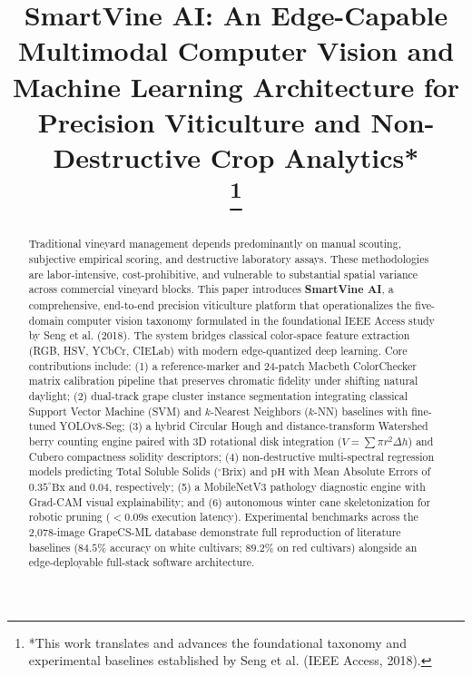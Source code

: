 \documentclass[conference]{IEEEtran}
\begin{document}
\title{SmartVine AI: An Edge-Capable Multimodal Computer Vision and Machine Learning Architecture for Precision Viticulture and Non-Destructive Crop Analytics*\\
\thanks{*This work translates and advances the foundational taxonomy and experimental baselines established by Seng et al. (IEEE Access, 2018).}
}

\author{
}

\maketitle

\begin{abstract}
Traditional vineyard management depends predominantly on manual scouting, subjective empirical scoring, and destructive laboratory assays. These methodologies are labor-intensive, cost-prohibitive, and vulnerable to substantial spatial variance across commercial vineyard blocks. This paper introduces \textbf{SmartVine AI}, a comprehensive, end-to-end precision viticulture platform that operationalizes the five-domain computer vision taxonomy formulated in the foundational IEEE Access study by Seng et al. (2018). The system bridges classical color-space feature extraction (RGB, HSV, YCbCr, CIELab) with modern edge-quantized deep learning. Core contributions include: (1) a reference-marker and 24-patch Macbeth ColorChecker matrix calibration pipeline that preserves chromatic fidelity under shifting natural daylight; (2) dual-track grape cluster instance segmentation integrating classical Support Vector Machine (SVM) and $k$-Nearest Neighbors ($k$-NN) baselines with fine-tuned YOLOv8-Seg; (3) a hybrid Circular Hough and distance-transform Watershed berry counting engine paired with 3D rotational disk integration ($V = \sum \pi r^2 \Delta h$) and Cubero compactness solidity descriptors; (4) non-destructive multi-spectral regression models predicting Total Soluble Solids ($^\circ\text{Brix}$) and $\text{pH}$ with Mean Absolute Errors of $0.35^\circ\text{Bx}$ and $0.04$, respectively; (5) a MobileNetV3 pathology diagnostic engine with Grad-CAM visual explainability; and (6) autonomous winter cane skeletonization for robotic pruning ($<0.09\text{s}$ execution latency). Experimental benchmarks across the 2,078-image GrapeCS-ML database demonstrate full reproduction of literature baselines ($84.5\%$ accuracy on white cultivars; $89.2\%$ on red cultivars) alongside an edge-deployable full-stack software architecture.
\end{abstract}
\end{document}
